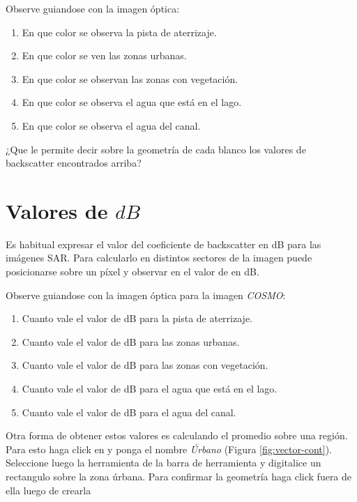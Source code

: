 Observe guiandose con la imagen óptica:

\begin{enumerate}
    \item En que color se observa la pista de aterrizaje.
    \item En que color se ven las zonas urbanas.
    \item En que color se observan las zonas con vegetación.
    \item En que color se observa el agua que está en el lago.
    \item En que color se observa el agua del canal.
\end{enumerate}

\begin{que}
    ¿Que le permite decir sobre la geometría de cada blanco los valores de backscatter encontrados arriba?
\end{que}

\section{Valores de $dB$}

Es habitual expresar el valor del coeficiente de backscatter en dB para las imágenes SAR. Para calcularlo en distintos sectores de la imagen puede posicionarse sobre un píxel y observar en  el valor de  en dB.

Observe guiandose con la imagen óptica para la imagen \emph{COSMO}:

\begin{enumerate}
    \item Cuanto vale el valor de dB para la pista de aterrizaje.
    \item Cuanto vale el valor de dB para las zonas urbanas.
    \item Cuanto vale el valor de dB para las zonas con vegetación.
    \item Cuanto vale el valor de dB para el agua que está en el lago.
    \item Cuanto vale el valor de dB para el agua del canal.
\end{enumerate}

Otra forma de obtener estos valores es calculando el promedio sobre una región. Para esto haga click en  y ponga el nombre \emph{Úrbano} (Figura \ref{fig:vector-cont}). Seleccione luego la herramienta  de la barra de herramienta y digitalice un rectangulo sobre la zona úrbana. Para confirmar la geometría haga click fuera de ella luego de crearla


